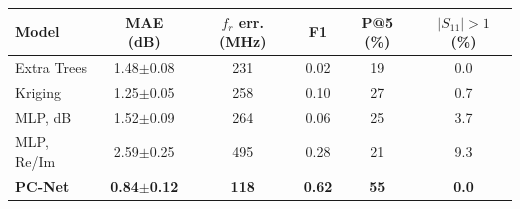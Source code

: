 \begin{tabular}{lccccc}
\toprule
Model & MAE (dB) & $f_r$ err. (MHz) & F1 & P@5 (\%) & $|S_{11}|{>}1$ (\%) \\
\midrule
Extra Trees & 1.48$\pm$0.08 & 231 & 0.02 & 19 & 0.0 \\
Kriging & 1.25$\pm$0.05 & 258 & 0.10 & 27 & 0.7 \\
MLP, dB & 1.52$\pm$0.09 & 264 & 0.06 & 25 & 3.7 \\
MLP, Re/Im & 2.59$\pm$0.25 & 495 & 0.28 & 21 & 9.3 \\
\textbf{PC-Net} & \textbf{0.84$\pm$0.12} & \textbf{118} & \textbf{0.62} & \textbf{55} & \textbf{0.0} \\
\bottomrule
\end{tabular}
